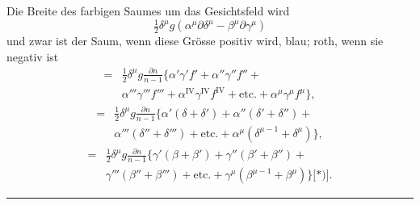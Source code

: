 Die Breite des farbigen Saumes um das Gesichtsfeld wird
\begin{equation}
\tfrac{1}{2}\delta^\mu g(\alpha^\mu\partial\delta^\mu-\beta^\mu\partial\gamma^\mu)
\tag*{[VII]}
\end{equation}
\noindent und zwar ist der Saum, wenn diese Grösse positiv wird, blau; roth, wenn sie negativ ist
\begin{equation}
\begin{aligned}
={}&\frac{1}{2}\delta^\mu g\frac{\partial n}{n-1}\{\alpha'\gamma'f'+\alpha''\gamma''f''\mathbin{+}{}\\
&\alpha'''\gamma'''f'''+\alpha^{\mathrm{IV}}\gamma^{\mathrm{IV}}f^{\mathrm{IV}}+\text{etc.}+\alpha^\mu\gamma^\mu f^\mu\},
\end{aligned}
\tag*{[VIIa]}
\end{equation}
\begin{equation}
\begin{aligned}
={}&\frac{1}{2}\delta^\mu g\frac{\partial n}{n-1}\{\alpha'(\delta+\delta')+\alpha''(\delta'+\delta'')\mathbin{+}{}\\
&\alpha'''(\delta''+\delta''')+\text{etc.}+\alpha^\mu(\delta^{\mu-1}+\delta^\mu)\},
\end{aligned}
\tag*{[VIIb]}
\end{equation}
\begin{equation}
\begin{aligned}
={}&\frac{1}{2}\delta^\mu g\frac{\partial n}{n-1}\{\gamma'(\beta+\beta')+\gamma''(\beta'+\beta'')\mathbin{+}{}\\
&\gamma'''(\beta''+\beta''')+\text{etc.}+\gamma^\mu(\beta^{\mu-1}+\beta^\mu)\}\text{[*)]}.\!
\end{aligned}
\tag*{[VIIc]}
\end{equation}
\begingroup\renewcommand{\thefootnote}{}\endgroup
\begin{center}\rule{.25\linewidth}{.4pt}\end{center}
\clearpage\endgroup
